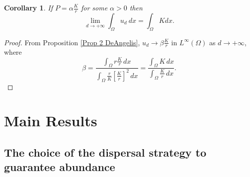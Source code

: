 \documentclass[11pt]{article}
\newcommand{\parentheses}[1]{\left(#1\right)}
\newcommand{\brackets}[1]{\left[#1\right]}
\newtheorem{corollary}[statement]{Corollary}
\theoremstyle{definition}
\theoremstyle{remark}
\begin{document}
\begin{corollary}
\label{cor:linear_dependence}
If $\displaystyle P = \alpha \frac{K}{r}$ for some $\alpha >0$ then
$$
\lim_{d \to +\infty} \int_{\Omega} u_d~dx = \int_{\Omega} K dx.
$$ 
\end{corollary}

\begin{proof}
    From Proposition \ref{Prop 2 DeAngelis}, $u_d\to \beta \frac{K}{r}$ in $L^\infty(\Omega)$ as $d\to+\infty$, where
\begin{equation*}
    \beta=\frac{\int_\Omega r\frac{K}{r}\,dx}{\int_\Omega\frac{r}{K}\brackets{\frac{K}{r}}^2\,dx}=\frac{\int_\Omega K\,dx}{\int_\Omega \frac{K}{r}\,dx}.
\end{equation*}
\end{proof}


%
%    



\section{Main Results}
\label{sec:main}


\subsection{The choice of the dispersal strategy to guarantee abundance}
\end{document}

